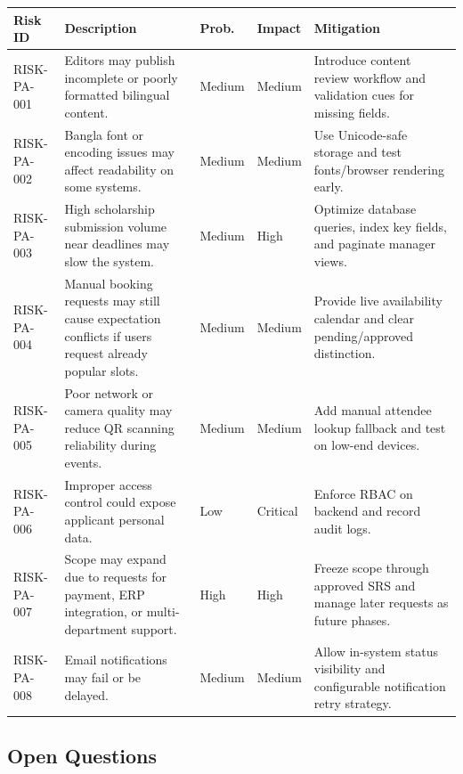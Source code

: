 \documentclass[12pt,a4paper]{article}
\newcommand{\thead}[1]{\textbf{\color{white}#1}}
\newcommand{\theadrow}{\rowcolor{headerblue}}
\begin{document}
\begin{longtable}{@{}L{1.8cm}L{4.8cm}C{1.5cm}C{1.5cm}L{3.8cm}@{}}
\theadrow \thead{Risk ID} & \thead{Description} & \thead{Prob.} & \thead{Impact} & \thead{Mitigation} \\
\endhead
RISK-PA-001 & Editors may publish incomplete or poorly formatted bilingual content. & Medium & Medium & Introduce content review workflow and validation cues for missing fields. \\
RISK-PA-002 & Bangla font or encoding issues may affect readability on some systems. & Medium & Medium & Use Unicode-safe storage and test fonts/browser rendering early. \\
RISK-PA-003 & High scholarship submission volume near deadlines may slow the system. & Medium & High & Optimize database queries, index key fields, and paginate manager views. \\
RISK-PA-004 & Manual booking requests may still cause expectation conflicts if users request already popular slots. & Medium & Medium & Provide live availability calendar and clear pending/approved distinction. \\
RISK-PA-005 & Poor network or camera quality may reduce QR scanning reliability during events. & Medium & Medium & Add manual attendee lookup fallback and test on low-end devices. \\
RISK-PA-006 & Improper access control could expose applicant personal data. & Low & Critical & Enforce RBAC on backend and record audit logs. \\
RISK-PA-007 & Scope may expand due to requests for payment, ERP integration, or multi-department support. & High & High & Freeze scope through approved SRS and manage later requests as future phases. \\
RISK-PA-008 & Email notifications may fail or be delayed. & Medium & Medium & Allow in-system status visibility and configurable notification retry strategy. \\
\bottomrule
\end{longtable}

\subsection{Open Questions}
\end{document}
